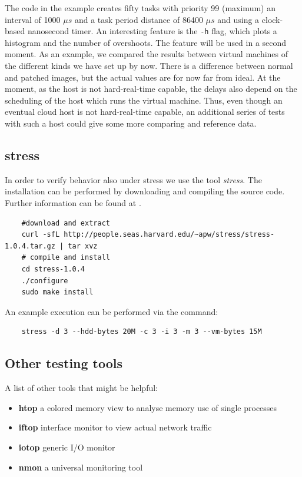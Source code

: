 \documentclass[]{scrartcl}
\begin{document}
The code in the example creates fifty tasks with priority 99 (maximum) an interval of 1000 $\mu s$ and a task period distance of 86400 $\mu s$ and using a clock-based nanosecond timer.
An interesting feature is the \texttt{-h} flag, which plots a histogram and the number of overshoots. The feature will be used in a second moment.
As an example, we compared the results between virtual machines of the different kinds we have set up by now. There is a difference between normal and patched images, but the actual values are for now far from ideal. 
At the moment, as the host is not hard-real-time capable, the delays also depend on the scheduling of the host which runs the virtual machine. Thus, even though an eventual cloud host is not hard-real-time capable, an additional series of tests with such a host could give some more comparing and reference data.

\subsection{stress}

In order to verify behavior also under stress we use the tool \textit{stress}. The installation can be performed by downloading and compiling the source code. Further information can be found at \cite{stress01}.

\begin{verbatim}
	#download and extract
	curl -sfL http://people.seas.harvard.edu/~apw/stress/stress-1.0.4.tar.gz | tar xvz
	# compile and install
	cd stress-1.0.4
	./configure
	sudo make install
\end{verbatim}

An example execution can be performed via the command:

\begin{verbatim}
	stress -d 3 --hdd-bytes 20M -c 3 -i 3 -m 3 --vm-bytes 15M
\end{verbatim}

\subsection{Other testing tools}

A list of other tools that might be helpful:

\begin{itemize}
	\item \textbf{htop} a colored memory view to analyse memory use of single processes
	\item \textbf{iftop} interface monitor to view actual network traffic
	\item \textbf{iotop} generic I/O monitor
	\item \textbf{nmon} a universal monitoring tool
\end{itemize}
\end{document}
